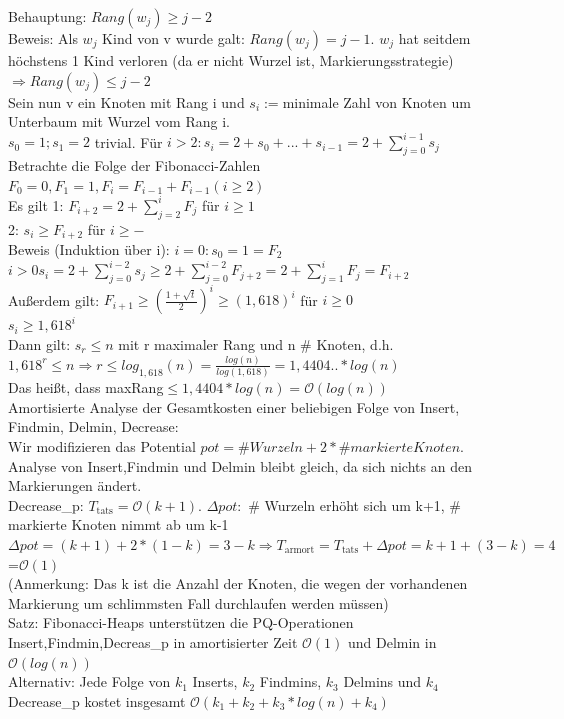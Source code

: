 \documentclass[a4paper]{article}
\newcommand{\oh}[1]{$\mathcal{O}(#1)$}
\begin{document}
Behauptung: $Rang(w_j)\geq j-2$\\
Beweis: Als $w_j$ Kind von v wurde galt: $Rang(w_j)=j-1$. $w_j$ hat seitdem höchstens 1 Kind verloren (da er nicht Wurzel ist, Markierungsstrategie) $\Rightarrow Rang(w_j)\leq j-2$\\
Sein nun v ein Knoten mit Rang i und $s_i := $minimale Zahl von Knoten um Unterbaum mit Wurzel vom Rang i.\\
$s_0=1; s_1=2$ trivial. Für $i>2: s_i=2+s_0+...+s_{i-1} = 2+\sum_{j=0}^{i-1}s_j$\\
Betrachte die Folge der Fibonacci-Zahlen $F_0=0, F_1=1, F_i=F_{i-1}+F_{i-1} (i\geq 2)$\\
Es gilt  1: $F_{i+2} = 2+\sum_{j=2}^{i}F_j$ für $i\geq 1$\\
2: $s_i \geq F_{i+2}$ für $i\geq -$\\
Beweis (Induktion über i): $i=0:s_0=1=F_2$\\
\hspace*{0.5cm}$i>0 s_i = 2+\sum_{j=0}^{i-2}s_j \geq 2+\sum_{j=0}^{i-2}F_{j+2} = 2+ \sum_{j=1}^i F_j = F_{i+2}$\\
Außerdem gilt: $F_{i+1} \geq (\frac{1+\sqrt{t}}{2})^i \geq (1,618)^i $ für $i\geq 0$\\
\hspace*{0.5cm} $s_i \geq 1,618^i$\\
Dann gilt: $s_r \leq n$ mit r maximaler Rang und n \# Knoten, d.h. $1,618^r \leq n \Rightarrow r\leq log_{1,618}(n) = \frac{log(n)}{log(1,618)} = 1,4404..*log(n)$\\
Das heißt, dass maxRang$\leq 1,4404*log(n) =$\oh{log(n)}\\
Amortisierte Analyse der Gesamtkosten einer beliebigen Folge von Insert, Findmin, Delmin, Decrease:\\
Wir modifizieren das Potential $pot=\# Wurzeln + 2*\# markierteKnoten$. Analyse von Insert,Findmin und Delmin bleibt gleich, da sich nichts an den Markierungen ändert.\\
Decrease\_p: $T_{\text{tats}} = $\oh{k+1}. $\Delta pot:$ \# Wurzeln erhöht sich um k+1, \# markierte Knoten nimmt ab um k-1\\
$\Delta pot=(k+1)+2*(1-k) = 3-k \Rightarrow T_{\text{armort}} =  T_{\text{tats}} + \Delta pot = k+1 + (3-k) = 4$=\oh{1}\\
(Anmerkung: Das k ist die Anzahl der Knoten, die wegen der vorhandenen Markierung um schlimmsten Fall durchlaufen werden müssen)\\
Satz: Fibonacci-Heaps unterstützen die PQ-Operationen Insert,Findmin,Decreas\_p in amortisierter Zeit \oh{1} und Delmin in \oh{log(n)}\\
Alternativ: Jede Folge von $k_1$ Inserts, $k_2$ Findmins, $k_3$ Delmins und $k_4$ Decrease\_p kostet insgesamt \oh{k_1+k_2+k_3*log(n)+k_4}\\
\end{document}
